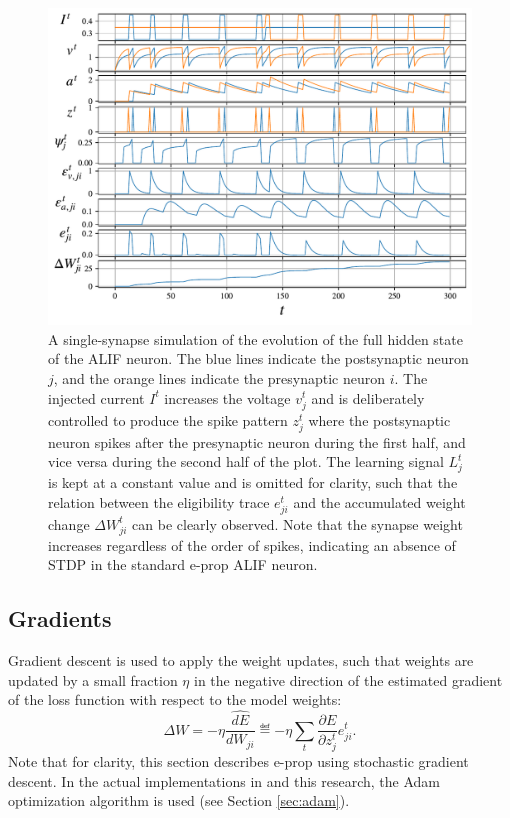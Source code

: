             \begin{figure}[ht]
                \centering
                \includegraphics[width=\linewidth]{gfx/alif}
                \caption[Single-synapse ALIF simulation]{A single-synapse simulation of the evolution of the full hidden state of the ALIF neuron. The blue lines indicate the postsynaptic neuron $j$, and the orange lines indicate the presynaptic neuron $i$. The injected current $I^t$ increases the voltage $v^t_j$ and is deliberately controlled to produce the spike pattern $z^t_j$ where the postsynaptic neuron spikes after the presynaptic neuron during the first half, and vice versa during the second half of the plot. The learning signal $L^t_j$ is kept at a constant value and is omitted for clarity, such that the relation between the eligibility trace $e^t_{ji}$ and the accumulated weight change $\Delta W^t_{ji}$ can be clearly observed. Note that the synapse weight increases regardless of the order of spikes, indicating an absence of STDP in the standard e-prop ALIF neuron.}
                \label{fig:alif}
            \end{figure}

        \subsection{Gradients}\label{sec:eprop_grd}
            Gradient descent is used to apply the weight updates, such that weights are updated by a small fraction $\eta$ in the negative direction of the estimated gradient of the loss function with respect to the model weights:
            \begin{equation}\label{eq:eprop_grd}
                \Delta W = -\eta\widehat{\frac{dE}{dW_{ji}}} \eqdef -\eta\sum_t\frac{\partial E}{\partial z^t_j}e^t_{ji}.
            \end{equation}
            Note that for clarity, this section describes e-prop using stochastic gradient descent.
            In the actual implementations in \citet{bellec2020solution} and this research, the Adam optimization algorithm \citep{kingma2014adam} is used (see Section \ref{sec:adam}).

